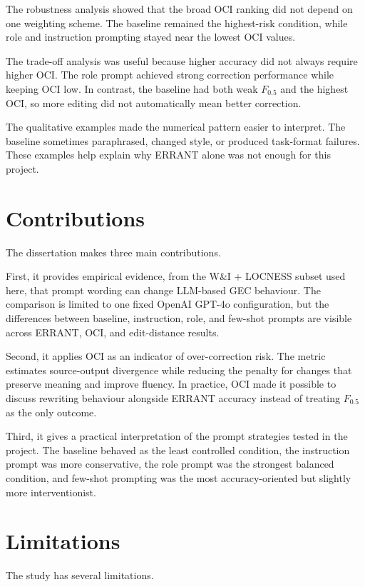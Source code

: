 The robustness analysis showed that the broad OCI ranking did not depend on one weighting scheme. The baseline remained the highest-risk condition, while role and instruction prompting stayed near the lowest OCI values.

The trade-off analysis was useful because higher accuracy did not always require higher OCI. The role prompt achieved strong correction performance while keeping OCI low. In contrast, the baseline had both weak $F_{0.5}$ and the highest OCI, so more editing did not automatically mean better correction.

The qualitative examples made the numerical pattern easier to interpret. The baseline sometimes paraphrased, changed style, or produced task-format failures. These examples help explain why ERRANT alone was not enough for this project.

\section{Contributions}

The dissertation makes three main contributions.

First, it provides empirical evidence, from the W\&I + LOCNESS subset used here, that prompt wording can change LLM-based GEC behaviour. The comparison is limited to one fixed OpenAI GPT-4o configuration, but the differences between baseline, instruction, role, and few-shot prompts are visible across ERRANT, OCI, and edit-distance results.

Second, it applies OCI as an indicator of over-correction risk. The metric estimates source-output divergence while reducing the penalty for changes that preserve meaning and improve fluency. In practice, OCI made it possible to discuss rewriting behaviour alongside ERRANT accuracy instead of treating $F_{0.5}$ as the only outcome.

Third, it gives a practical interpretation of the prompt strategies tested in the project. The baseline behaved as the least controlled condition, the instruction prompt was more conservative, the role prompt was the strongest balanced condition, and few-shot prompting was the most accuracy-oriented but slightly more interventionist.

\section{Limitations}

The study has several limitations.

